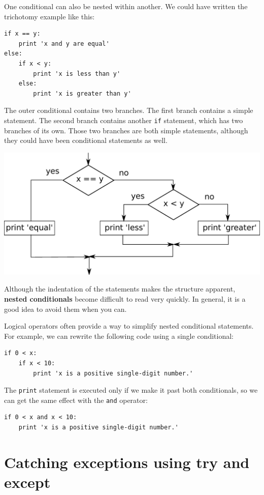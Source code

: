 \documentclass[10pt]{book}
\begin{document}
One conditional can also be nested within another.  We could have
written the trichotomy example like this:

\beforeverb
\begin{verbatim}
if x == y:
    print 'x and y are equal'
else:
    if x < y:
        print 'x is less than y'
    else:
        print 'x is greater than y'
\end{verbatim}
\afterverb
%
The outer conditional contains two branches.  The
first branch contains a simple statement.  The second branch
contains another {\tt if} statement, which has two branches of its
own.  Those two branches are both simple statements,
although they could have been conditional statements as well.

\beforefig
\centerline{\includegraphics[height=2.50in]{figs2/nested.eps}}
\afterfig

Although the indentation of the statements makes the structure
apparent, {\bf nested conditionals} become difficult to read very
quickly. In general, it is a good idea to avoid them when you can.

Logical operators often provide a way to simplify nested conditional
statements.  For example, we can rewrite the following code using a
single conditional:

\beforeverb
\begin{verbatim}
if 0 < x:
    if x < 10:
        print 'x is a positive single-digit number.'
\end{verbatim}
\afterverb
%
The {\tt print} statement is executed only if we make it past both
conditionals, so we can get the same effect with the {\tt and} operator:

\beforeverb
\begin{verbatim}
if 0 < x and x < 10:
    print 'x is a positive single-digit number.'
\end{verbatim}
\afterverb


\section{Catching exceptions using try and except}
\label{catch1}
\end{document}
